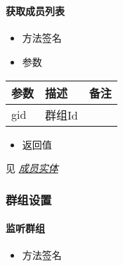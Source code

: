 \documentclass[letterpaper,10pt,english]{sphinxmanual}
\begin{document}
​


\paragraph{获取成员列表}
\label{\detokenize{csharp:id41}}\begin{itemize}
\item {} 
方法签名

\end{itemize}

%
\begin{sphinxVerbatim}[commandchars=\\\{\}]
 \PYG{p}{[}\PYG{p}{]}  
\end{sphinxVerbatim}
\begin{itemize}
\item {} 
参数

\end{itemize}


\begin{savenotes}\sphinxattablestart
\centering
\begin{tabulary}{\linewidth}[t]{|T|T|T|}
\hline
\sphinxstyletheadfamily 
参数
&\sphinxstyletheadfamily 
描述
&\sphinxstyletheadfamily 
备注
\\
\hline
gid
&
群组Id
&\\
\hline
\end{tabulary}
\par
\sphinxattableend\end{savenotes}
\begin{itemize}
\item {} 
返回值

\end{itemize}

见 {\hyperref[\detokenize{csharp:member}]{\emph{成员实体}}}


\subsubsection{群组设置}
\label{\detokenize{csharp:id42}}

\paragraph{监听群组}
\label{\detokenize{csharp:id43}}\begin{itemize}
\item {} 
方法签名

\end{itemize}
\end{document}
